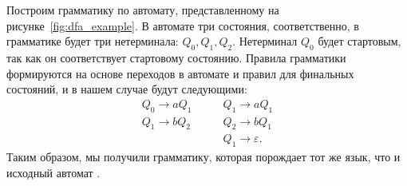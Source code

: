 \begin{example}
Построим грамматику по автомату, представленному на рисунке~\ref{fig:dfa_example}.
В автомате три состояния, соответственно, в грамматике будет три нетерминала: $Q_0, Q_1, Q_2$.
Нетерминал $Q_0$ будет стартовым, так как он соответствует стартовому состоянию.
Правила грамматики формируются на основе переходов в автомате и правил для финальных состояний, и в нашем случае будут следующими:
\begin{align*}
    Q_0 \to a Q_1  \quad & \quad Q_1 \to a Q_1 \\
    Q_1 \to b Q_2  \quad & \quad Q_2 \to b Q_1 \\
                     \quad & \quad Q_1 \to \varepsilon.
\end{align*}
Таким образом, мы получили грамматику, которая порождает тот же язык, что и исходный автомат%
.
\end{example}

\begin{marginfigure}
    \begin{center}
    \end{center}
    \caption{Автомат, построенный по грамматике $S \to aN_1$, $N_1 \to aN_1 \mid bbN_1 \mid \varepsilon$.
    Эквивалентен автомату из примера~\ref{example:DFA}.}
    \label{fig:grammar_to_dfa}
\end{marginfigure}

